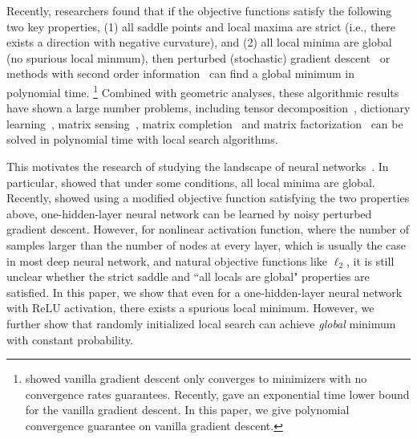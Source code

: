 \documentclass{article}
\begin{document}
Recently, researchers found that if the objective functions satisfy the following two key properties, (1) all saddle points and local maxima are strict (i.e., there exists a direction with negative curvature), and (2) all local minima are global (no spurious local minmum), then perturbed (stochastic) gradient descent~\citep{ge2015escaping} or methods with second order information~\citep{carmon2016accelerated,agarwal2016finding} can find a global minimum in polynomial time.
\footnote{\citet{lee2016gradient} showed vanilla gradient descent only converges to minimizers with no convergence rates guarantees. Recently, \citet{du2017gradient} gave an exponential time lower bound for the vanilla gradient descent.
In this paper, we give polynomial convergence guarantee on vanilla gradient descent.}
Combined with geometric analyses, these algorithmic results have shown a large number problems, including tensor decomposition~\citep{ge2015escaping}, dictionary learning~\citep{sun2017complete}, matrix sensing~\citep{bhojanapalli2016global,park2017non}, matrix completion~\citep{ge2017no,ge2016matrix} and matrix factorization~\citep{li2016symmetry} can be solved in polynomial time with local search algorithms.

This motivates the research of studying the landscape of neural networks~\citep{kawaguchi2016deep,choromanska2015loss,hardt2016identity,haeffele2015global,mei2016landscape,freeman2016topology,safran2016quality,zhou2017landscape,nguyen2017loss,nguyen2017loss2,ge2017learning,zhou2017landscape,safran2017spurious}.
In particular, \citet{kawaguchi2016deep,hardt2016identity,zhou2017landscape,nguyen2017loss,nguyen2017loss2,feizi2017porcupine} showed that under some conditions, all local minima are global.
Recently, \citet{ge2017learning} showed using a modified objective function satisfying the two properties above, one-hidden-layer neural network can be learned by noisy perturbed gradient descent.
However, for nonlinear activation function, where the number of samples larger than the number of nodes at every layer, which is usually the case in most deep neural network, and natural objective functions like $\ell_2$, it is still unclear whether the strict saddle and ``all locals are global" properties are satisfied.
In this paper, we show that even for a one-hidden-layer neural network with ReLU activation, there exists a spurious local minimum.
However, we further show that randomly initialized local search can achieve \emph{global} minimum with constant probability.
\end{document}
